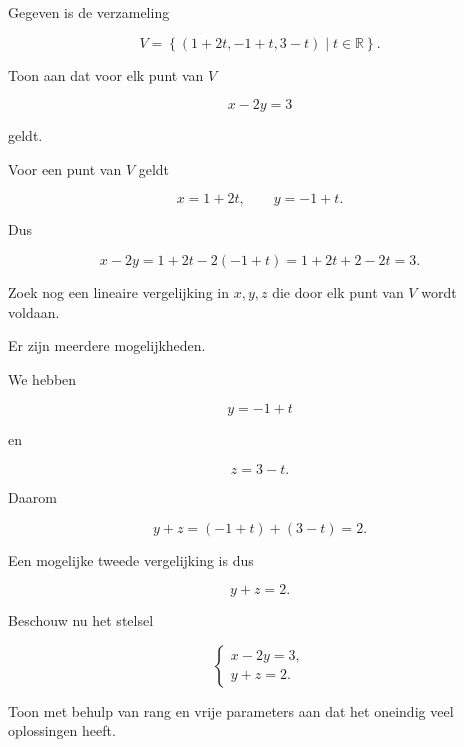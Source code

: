 \documentclass{ximera}
\begin{document}
\begin{oefening}{\oefG}

Gegeven is de verzameling

\[
V=
\left\{
(1+2t,-1+t,3-t)
\mid t\in\mathbb{R}
\right\}.
\]

\begin{question}

Toon aan dat voor elk punt van \(V\)

\[
x-2y=3
\]

geldt.

\begin{oplossing}

Voor een punt van \(V\) geldt

\[
x=1+2t,
\qquad
y=-1+t.
\]

Dus

\[
x-2y
=
1+2t-2(-1+t)
=
1+2t+2-2t
=
3.
\]

\end{oplossing}

\end{question}


\begin{question}

Zoek nog een lineaire vergelijking in \(x,y,z\)
die door elk punt van \(V\) wordt voldaan.

\begin{oplossing}

Er zijn meerdere mogelijkheden.

We hebben

\[
y=-1+t
\]

en

\[
z=3-t.
\]

Daarom

\[
y+z
=
(-1+t)+(3-t)
=
2.
\]

Een mogelijke tweede vergelijking is dus

\[
y+z=2.
\]

\end{oplossing}

\end{question}


\begin{question}

Beschouw nu het stelsel

\[
\begin{cases}
x-2y=3,\\
y+z=2.
\end{cases}
\]

Toon met behulp van rang en vrije parameters aan dat het
oneindig veel oplossingen heeft.


\end{question}
\end{oefening}
\end{document}
